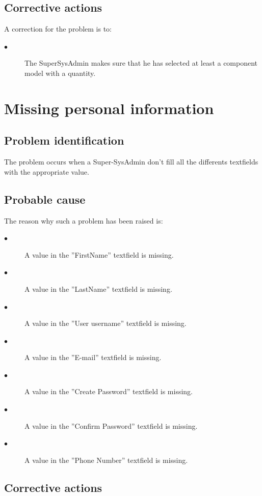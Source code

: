 \subsection{Corrective actions}

A correction for the problem is to:\\
\begin{description}
\item[$\bullet$] The SuperSysAdmin makes sure that he has selected at least a
component model with a quantity.
\end{description}







\section{Missing personal information} 

\subsection{Problem identification}
The problem occurs when a Super-SysAdmin don't fill all the differents
textfields with the appropriate value.
\subsection{Probable cause}

The reason why such a problem has been raised is:\\
\begin{description}
\item[$\bullet$] A value in the ''FirstName'' textfield is missing.
\item[$\bullet$] A value in the ''LastName'' textfield is missing.
\item[$\bullet$] A value in the ''User username'' textfield is missing.
\item[$\bullet$] A value in the ''E-mail'' textfield is missing.
\item[$\bullet$] A value in the ''Create Password'' textfield is missing.
\item[$\bullet$] A value in the ''Confirm Password'' textfield is missing.
\item[$\bullet$] A value in the ''Phone Number'' textfield is missing.

\end{description}


\subsection{Corrective actions}

